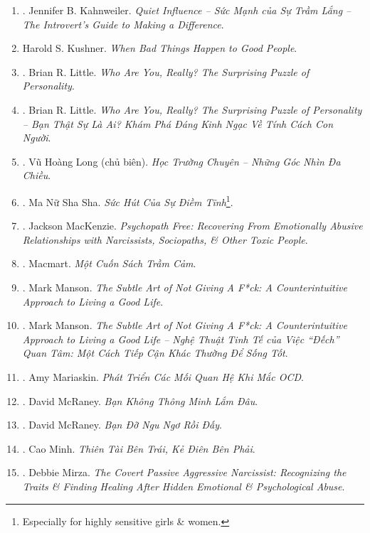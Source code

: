 \documentclass{article}
\begin{document}
\begin{enumerate}
	\item \cite{Kahnweiler2022}. Jennifer B. Kahnweiler. \textit{Quiet Influence -- Sức Mạnh của Sự Trầm Lắng -- The Introvert's Guide to Making a Difference}.\hfill{\sf[done]}
	\item Harold S. Kushner. \textit{When Bad Things Happen to Good People}.
	\item \cite{Little2017}. Brian R. Little. \textit{Who Are You, Really? The Surprising Puzzle of Personality}.\hfill{\sf[done]}
	\item \cite{Little2023}. Brian R. Little. \textit{Who Are You, Really? The Surprising Puzzle of Personality -- Bạn Thật Sự Là Ai? Khám Phá Đáng Kinh Ngạc Về Tính Cách Con Người}.\hfill{\sf[done]}
	\item \cite{Long2021}. Vũ Hoàng Long (chủ biên). \textit{Học Trường Chuyên -- Những Góc Nhìn Đa Chiều}.\hfill{\sf[done]}
	\item \cite{MNSS_calm}. Ma Nữ Sha Sha. \textit{Sức Hút Của Sự Điềm Tĩnh}\footnote{Especially for highly sensitive girls \& women.}.\hfill{\sf[done]}
	\item \cite{MacKenzie2015}. Jackson MacKenzie. \textit{Psychopath Free: Recovering From Emotionally Abusive Relationships with Narcissists, Sociopaths, \& Other Toxic People}.\hfill{\sf[done]}
	\item \cite{Macmart_depress}. Macmart. \textit{Một Cuốn Sách Trầm Cảm}.\hfill{\sf[reading]}
	\item \cite{Manson_giving_fuck}. Mark Manson. \textit{The Subtle Art of Not Giving A F*ck: A Counterintuitive Approach to Living a Good Life}.\hfill{\sf[reading]}
	\item \cite{Manson_giving_fuck_vn}. Mark Manson. \textit{The Subtle Art of Not Giving A F*ck: A Counterintuitive Approach to Living a Good Life -- Nghệ Thuật Tinh Tế của Việc ``Đếch'' Quan Tâm: Một Cách Tiếp Cận Khác Thường Để Sống Tốt}.\hfill{\sf[done]}
	\item \cite{Mariaskin_OCD}. Amy Mariaskin. \textit{Phát Triển Các Mối Quan Hệ Khi Mắc OCD}.\hfill{\sf[done]}
	\item \cite{McRaney2022a}. David McRaney. \textit{Bạn Không Thông Minh Lắm Đâu}.\hfill{\sf[done]}
	\item \cite{McRaney2022b}. David McRaney. \textit{Bạn Đỡ Ngu Ngơ Rồi Đấy}.\hfill{\sf[done]}
	\item \cite{Minh2022}. Cao Minh. \textit{Thiên Tài Bên Trái, Kẻ Điên Bên Phải}.\hfill{\sf[done]}
	\item \cite{Mirza2017}. Debbie Mirza. \textit{The Covert Passive Aggressive Narcissist: Recognizing the Traits \& Finding Healing After Hidden Emotional \& Psychological Abuse}.\hfill{\sf[done]}

\end{enumerate}
\end{document}
